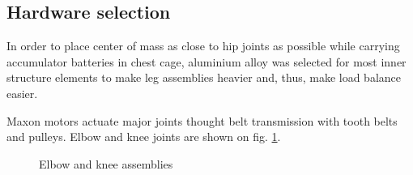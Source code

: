 \documentclass[letterpaper, 10 pt, conference]{ieeeconf}  %
\begin{document}
\subsection{Hardware selection}
In order to place center of mass as close to hip joints as possible while
carrying accumulator batteries in chest cage, aluminium alloy was selected for
most inner structure elements to make leg assemblies heavier and, thus, make
load balance easier.

Maxon motors actuate major joints thought belt transmission with tooth belts and
pulleys. Elbow and knee joints are shown on fig.
\ref{img:joints}.

\begin{figure}[h]
\caption{Elbow and knee assemblies}
\label{img:joints}
\end{figure}
\end{document}
